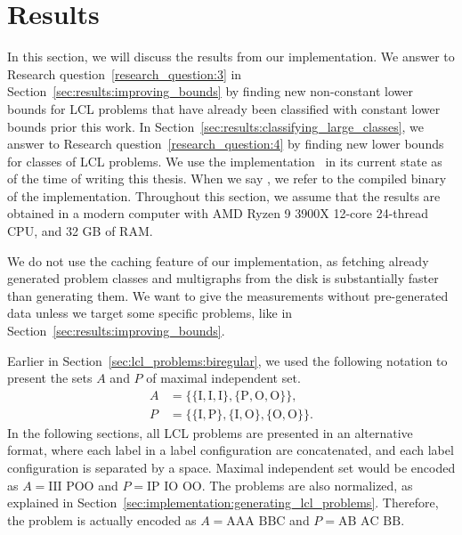 
\section{Results} \label{sec:results}

\lstset{
  basicstyle=\ttfamily,
  mathescape,
  columns=fixed,
  fontadjust=true,
  basewidth=0.5em
}


In this section, we will discuss the results from our implementation.
We answer to Research question~\ref{research_question:3} in Section~\ref{sec:results:improving_bounds} by finding new non-constant lower bounds for LCL problems that have already been classified with constant lower bounds prior this work.
In Section~\ref{sec:results:classifying_large_classes}, we answer to Research question~\ref{research_question:4} by finding new lower bounds for classes of LCL problems.
We use the implementation~\cite[commit ]{NonconstantLclClassifier2022} in its current state as of the time of writing this thesis.
When we say , we refer to the compiled binary of the implementation.
Throughout this section, we assume that the results are obtained in a modern computer with AMD Ryzen 9 3900X 12-core 24-thread CPU, and 32 GB of RAM.

We do not use the caching feature of our implementation, as fetching already generated problem classes and multigraphs from the disk is substantially faster than generating them.
We want to give the measurements without pre-generated data unless we target some specific problems, like in Section~\ref{sec:results:improving_bounds}.

Earlier in Section~\ref{sec:lcl_problems:biregular}, we used the following notation to present the sets $A$ and $P$ of maximal independent set.
\begin{align*}
    A &= \mathrm{\{\{I,I,I\},\{P,O,O\}\}}, \\
    P &= \mathrm{\{\{I,P\},\{I,O\},\{O,O\}\}}.
  \end{align*}
In the following sections, all LCL problems are presented in an alternative format, where each label in a label configuration are concatenated, and each label configuration is separated by a space.
Maximal independent set would be encoded as
$A = \text{III POO}$ and $P = \text{IP IO OO}$.
The problems are also normalized, as explained in Section~\ref{sec:implementation:generating_lcl_problems}.
Therefore, the problem is actually encoded as $A = \text{AAA BBC}$ and $P = \text{AB AC BB}$.


